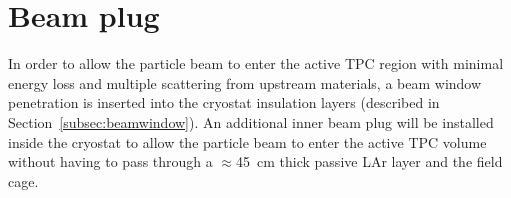 \section{Beam plug}
\label{sec:beamplug}

In order to allow the particle beam to enter the active TPC region with minimal energy loss and multiple scattering from upstream materials, a beam window penetration is inserted into the cryostat insulation layers (described in Section~\ref{subsec:beamwindow}). An additional inner 
beam plug will be installed inside the cryostat to allow the particle beam to enter the active TPC volume without having to pass through 
a $\approx$45~cm thick passive LAr layer and the field cage.


%
